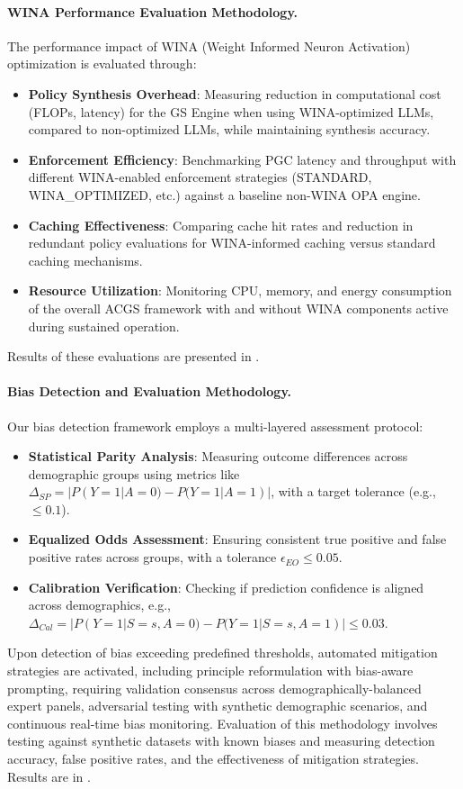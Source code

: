 \documentclass[manuscript,screen,review,anonymous,9pt]{acmart}
\begin{document}
\paragraph{WINA Performance Evaluation Methodology.}
\label{subsubsec:wina_performance_evaluation_methods}
The performance impact of WINA (Weight Informed Neuron Activation) optimization is evaluated through:
\begin{itemize}[leftmargin=*,itemsep=1pt,parsep=1pt]
    \item \textbf{Policy Synthesis Overhead}: Measuring reduction in computational cost (FLOPs, latency) for the GS Engine when using WINA-optimized LLMs, compared to non-optimized LLMs, while maintaining synthesis accuracy.
    \item \textbf{Enforcement Efficiency}: Benchmarking PGC latency and throughput with different WINA-enabled enforcement strategies (STANDARD, WINA\_OPTIMIZED, etc.) against a baseline non-WINA OPA engine.
    \item \textbf{Caching Effectiveness}: Comparing cache hit rates and reduction in redundant policy evaluations for WINA-informed caching versus standard caching mechanisms.
    \item \textbf{Resource Utilization}: Monitoring CPU, memory, and energy consumption of the overall ACGS framework with and without WINA components active during sustained operation.
\end{itemize}
Results of these evaluations are presented in .

\paragraph{Bias Detection and Evaluation Methodology.}
\label{subsubsec:bias_detection_evaluation_methods}
Our bias detection framework employs a multi-layered assessment protocol:
\begin{itemize}[leftmargin=*,itemsep=1pt,parsep=1pt]
    \item \textbf{Statistical Parity Analysis}: Measuring outcome differences across demographic groups using metrics like $\Delta_{SP} = |P(Y=1|A=0) - P(Y=1|A=1)|$, with a target tolerance (e.g., $\leq 0.1$).
    \item \textbf{Equalized Odds Assessment}: Ensuring consistent true positive and false positive rates across groups, with a tolerance $\epsilon_{EO} \leq 0.05$.
    \item \textbf{Calibration Verification}: Checking if prediction confidence is aligned across demographics, e.g., $\Delta_{Cal} = |P(Y=1|S=s,A=0) - P(Y=1|S=s,A=1)| \leq 0.03$.
\end{itemize}
Upon detection of bias exceeding predefined thresholds, automated mitigation strategies are activated, including principle reformulation with bias-aware prompting, requiring validation consensus across demographically-balanced expert panels, adversarial testing with synthetic demographic scenarios, and continuous real-time bias monitoring. Evaluation of this methodology involves testing against synthetic datasets with known biases and measuring detection accuracy, false positive rates, and the effectiveness of mitigation strategies. Results are in .
\end{document}

